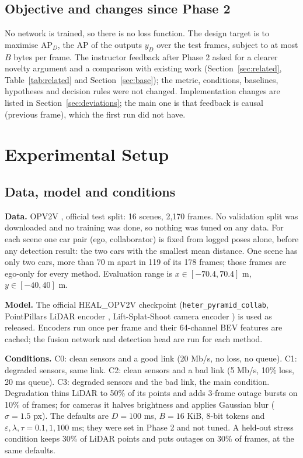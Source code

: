 \documentclass[conference]{IEEEtran}
\begin{document}
\subsection{Objective and changes since Phase 2}
No network is trained, so there is no loss function. The design target is to maximise $\mathrm{AP}_D$, the AP of the outputs $y_D$ over the test frames, subject to at most $B$ bytes per frame. The instructor feedback after Phase 2 asked for a clearer novelty argument and a comparison with existing work (Section~\ref{sec:related}, Table~\ref{tab:related} and Section~\ref{sec:base}); the metric, conditions, baselines, hypotheses and decision rules were not changed. Implementation changes are listed in Section~\ref{sec:deviations}; the main one is that feedback is causal (previous frame), which the first run did not have.

\section{Experimental Setup}\label{sec:setup}
\subsection{Data, model and conditions}
\textbf{Data.} OPV2V \cite{xu2022opv2v}, official test split: 16 scenes, 2,170 frames. No validation split was downloaded and no training was done, so nothing was tuned on any data. For each scene one car pair (ego, collaborator) is fixed from logged poses alone, before any detection result: the two cars with the smallest mean distance. One scene has only two cars, more than 70 m apart in 119 of its 178 frames; those frames are ego-only for every method. Evaluation range is $x\in[-70.4,70.4]$ m, $y\in[-40,40]$ m.

\textbf{Model.} The official HEAL\_OPV2V checkpoint \cite{lu2024heal} (\texttt{heter\_pyramid\_collab}, PointPillars LiDAR encoder \cite{lang2019}, Lift-Splat-Shoot camera encoder \cite{philion2020}) is used as released. Encoders run once per frame and their 64-channel BEV features are cached; the fusion network and detection head are run for each method.

\textbf{Conditions.} C0: clean sensors and a good link (20 Mb/s, no loss, no queue). C1: degraded sensors, same link. C2: clean sensors and a bad link (5 Mb/s, 10\% loss, 20 ms queue). C3: degraded sensors and the bad link, the main condition. Degradation thins LiDAR to 50\% of its points and adds 3-frame outage bursts on 10\% of frames; for cameras it halves brightness and applies Gaussian blur ($\sigma=1.5$ px). The defaults are $D=100$ ms, $B=16$ KiB, 8-bit tokens and $\varepsilon,\lambda,\tau=0.1,1,100$ ms; they were set in Phase 2 and not tuned. A held-out stress condition keeps 30\% of LiDAR points and puts outages on 30\% of frames, at the same defaults.
\end{document}
